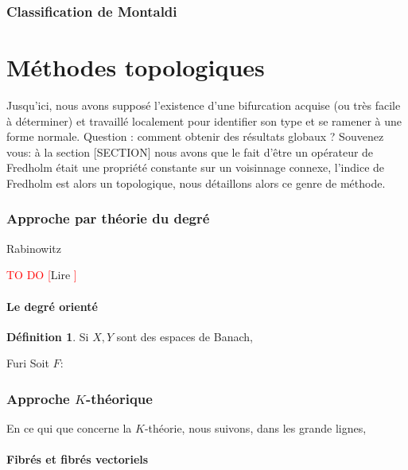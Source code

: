 \documentclass[a4paper,12pt,oneside,titlepage]{article}
\newcommand{\todo}[1]{\textcolor{red}{TO DO [}#1\textcolor{red}{]}}
\theoremstyle{definition}
\newtheorem{definition}{Définition}[section]
\theoremstyle{plain}
\begin{document}
\section{Classification de Montaldi}



\newpage

\part{Méthodes topologiques}

Jusqu'ici, nous avons supposé l'existence d'une bifurcation acquise (ou très facile à déterminer) et travaillé localement pour identifier son type et se ramener à une forme normale. Question : comment obtenir des résultats globaux ? Souvenez vous: à la section [SECTION] nous avons que le fait d'être un opérateur de Fredholm était une propriété constante sur un voisinnage connexe, l'indice de Fredholm est alors un  topologique, nous détaillons alors ce genre de méthode.

\section{Approche par théorie du degré}

\begin{theobox}{Rabinowitz}{}
    
\end{theobox}


\todo{Lire \cite{Feckan2008Topological}}

\subsection{Le degré orienté}
\begin{definition}
    Si $X,Y$ sont des espaces de Banach, 
\end{definition}
\begin{theobox}{Furi}{}
    Soit $F: $
\end{theobox}

\section{Approche $K$-théorique}\label{K-th}

En ce qui que concerne la $K$-théorie, nous suivons, dans les grande lignes, \cite{Karoubi1978KTheory}


\subsection{Fibrés et fibrés vectoriels}
\end{document}
